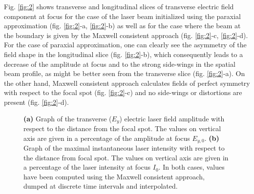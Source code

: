 Fig. \ref{fig:2} shows transverse and longitudinal slices of transverse electric field component at focus for the case of the laser beam initialized using the paraxial approximation (fig. \ref{fig:2}-a, \ref{fig:2}-b) as well as for the case where the beam at the boundary is given by the Maxwell consistent approach (fig. \ref{fig:2}-c, \ref{fig:2}-d). For the case of paraxial approximation, one can clearly see the asymmetry of the field shape in the longitudinal slice (fig. \ref{fig:2}-b), which consequently leads to a decrease of the amplitude at focus and to the strong side-wings in the spatial beam profile, as might be better seen from the transverse slice (fig. \ref{fig:2}-a). On the other hand, Maxwell consistent approach calculates fields of perfect symmetry with respect to the focal spot (fig. \ref{fig:2}-c) and no side-wings or distortions are present (fig. \ref{fig:2}-d).

\begin{figure}[h!]
	\centering
	\hspace{2mm}
	\caption{\textbf{(a)} Graph of the transverse ($ E_{y} $) electric laser field amplitude with respect to the distance from the focal spot. The values on vertical axis are given in a percentage of the amplitude at focus $ E_{y, 0} $. \textbf{(b)} Graph of the maximal instantaneous laser intensity with respect to the distance from focal spot. The values on vertical axis are given in a percentage of the laser intensity at focus $ I_{0} $. In both cases, values have been computed using the Maxwell consistent approach, dumped at discrete time intervals and interpolated.}
	\label{fig:8}
\end{figure}


